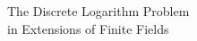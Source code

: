\documentclass[preview]{standalone}
\begin{document}
\begin{center}
The Discrete Logarithm Problem \\ in Extensions of Finite Fields
\end{center}
\end{document}
